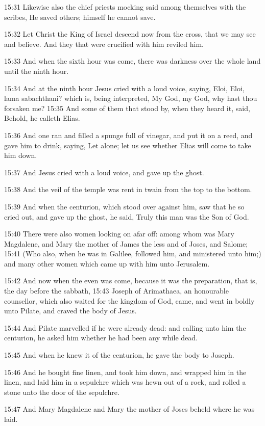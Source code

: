 15:31 Likewise also the chief priests mocking said among themselves
with the scribes, He saved others; himself he cannot save.

15:32 Let Christ the King of Israel descend now from the cross, that
we may see and believe. And they that were crucified with him reviled
him.

15:33 And when the sixth hour was come, there was darkness over the
whole land until the ninth hour.

15:34 And at the ninth hour Jesus cried with a loud voice, saying,
Eloi, Eloi, lama sabachthani? which is, being interpreted, My God, my
God, why hast thou forsaken me?  15:35 And some of them that stood by,
when they heard it, said, Behold, he calleth Elias.

15:36 And one ran and filled a spunge full of vinegar, and put it on a
reed, and gave him to drink, saying, Let alone; let us see whether
Elias will come to take him down.

15:37 And Jesus cried with a loud voice, and gave up the ghost.

15:38 And the veil of the temple was rent in twain from the top to the
bottom.

15:39 And when the centurion, which stood over against him, saw that
he so cried out, and gave up the ghost, he said, Truly this man was
the Son of God.

15:40 There were also women looking on afar off: among whom was Mary
Magdalene, and Mary the mother of James the less and of Joses, and
Salome; 15:41 (Who also, when he was in Galilee, followed him, and
ministered unto him;) and many other women which came up with him unto
Jerusalem.

15:42 And now when the even was come, because it was the preparation,
that is, the day before the sabbath, 15:43 Joseph of Arimathaea, an
honourable counsellor, which also waited for the kingdom of God, came,
and went in boldly unto Pilate, and craved the body of Jesus.

15:44 And Pilate marvelled if he were already dead: and calling unto
him the centurion, he asked him whether he had been any while dead.

15:45 And when he knew it of the centurion, he gave the body to
Joseph.

15:46 And he bought fine linen, and took him down, and wrapped him in
the linen, and laid him in a sepulchre which was hewn out of a rock,
and rolled a stone unto the door of the sepulchre.

15:47 And Mary Magdalene and Mary the mother of Joses beheld where he
was laid.

